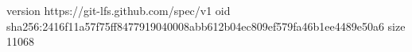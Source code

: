 version https://git-lfs.github.com/spec/v1
oid sha256:2416f11a57f75ff8477919040008abb612b04ec809ef579fa46b1ee4489e50a6
size 11068
